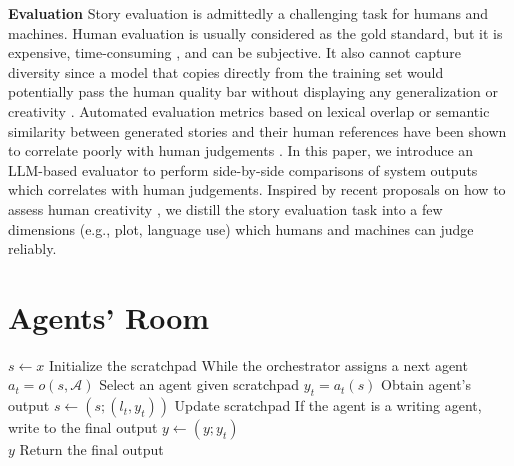 \documentclass{article}
\newcommand{\Agentsroom}{\textsc{Agents' Room}}
\newcommand{\reinald}[1]{{\textcolor{teal}{\bf{Reinald:} \emph{#1}}}}
\begin{document}
\textbf{Evaluation}
Story evaluation is admittedly a challenging task for humans and
machines. Human evaluation is usually considered as the gold standard,
but it is expensive, time-consuming \citep{guan-huang-2020-union}, and
can be subjective. It also cannot capture diversity since a model that copies directly from the training set would potentially pass the human quality bar without displaying any generalization or creativity
\citep{hashimoto-etal-2019-unifying}. Automated evaluation metrics based
on lexical overlap or semantic similarity between generated stories and their human references have been shown to correlate poorly with
human judgements \citep{chhun-etal-2022-human}. In this paper, we
introduce an LLM-based evaluator
\citep{liusie2023zero,liu2024aligning,zheng2024judging,bohnet2024long}
to perform side-by-side comparisons of system outputs which correlates
with human judgements. Inspired by recent proposals on how to assess
human creativity \citep{chakrabarty:ea:2024a}, we distill the story
evaluation task into a few dimensions (e.g., plot, language use) which humans and machines can judge reliably.

\section{Agents' Room}



% 





\begin{algorithm}[t]
\caption{\Agentsroom\ framework}
\label{alg:agents_room}
\begin{algorithmic}
\State $s \gets x$ \Comment Initialize the scratchpad
 \Comment While the orchestrator assigns a next agent
    \State $a_t = o(s, \mathcal{A})$ \Comment Select an agent given scratchpad
    \State $y_t = a_t(s)$ \Comment  Obtain agent's output
    \State $s \gets (s; (l_t, y_t))$ \Comment Update scratchpad
     \Comment If the agent is a writing agent, write to the final output
    \State $y \gets (y; y_t)$
    \EndIf
\EndWhile \\
\Return $y$ \Comment Return the final output
\end{algorithmic}
\end{algorithm}
\end{document}
